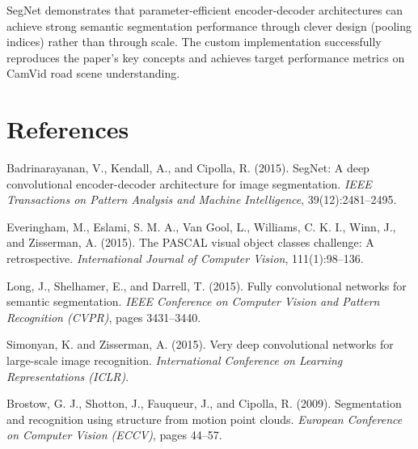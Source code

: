 \documentclass[11pt,a4paper]{report}
\begin{document}
\begin{tcolorbox}[
  colback=LightGray,
  colframe=black!40,
  boxrule=0.6pt,
  arc=2pt,
  left=4pt,
  right=4pt,
  top=6pt,
  bottom=6pt,
  breakable=false,
  title=\textbf{Summary},
  coltitle=black,
  colbacktitle=LightGray,
  fonttitle=\bfseries,
]
\color{black}%
SegNet demonstrates that parameter-efficient encoder-decoder architectures can achieve strong semantic segmentation performance through clever design (pooling indices) rather than through scale. The custom implementation successfully reproduces the paper's key concepts and achieves target performance metrics on CamVid road scene understanding.
\end{tcolorbox}

\chapter{References}

\begin{thebibliography}{99}

Badrinarayanan, V., Kendall, A., and Cipolla, R. (2015).
\newblock SegNet: A deep convolutional encoder-decoder architecture for image segmentation.
\newblock \textit{IEEE Transactions on Pattern Analysis and Machine Intelligence},
  39(12):2481--2495.

Everingham, M., Eslami, S. M. A., Van Gool, L., Williams, C. K. I., Winn, J.,
  and Zisserman, A. (2015).
\newblock The PASCAL visual object classes challenge: A retrospective.
\newblock \textit{International Journal of Computer Vision}, 111(1):98--136.

Long, J., Shelhamer, E., and Darrell, T. (2015).
\newblock Fully convolutional networks for semantic segmentation.
\newblock \textit{IEEE Conference on Computer Vision and Pattern Recognition (CVPR)},
  pages 3431--3440.

Simonyan, K. and Zisserman, A. (2015).
\newblock Very deep convolutional networks for large-scale image recognition.
\newblock \textit{International Conference on Learning Representations (ICLR)}.

Brostow, G. J., Shotton, J., Fauqueur, J., and Cipolla, R. (2009).
\newblock Segmentation and recognition using structure from motion point clouds.
\newblock \textit{European Conference on Computer Vision (ECCV)},
  pages 44--57.

\end{thebibliography}
\end{document}

